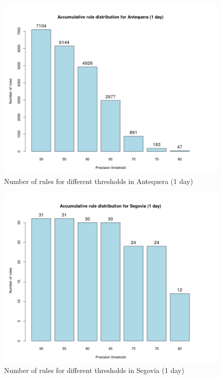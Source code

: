 \documentclass[a4paper,12pt]{article}
\begin{document}
\begin{figure}[hbtp]
\includegraphics[width=\textwidth]{img/precision_ant1.png}
\caption{Number of rules for different thresholds in Antequera (1 day)} \label{fig:precision_ant1}
\end{figure}

\begin{figure}[hbtp]
\includegraphics[width=\textwidth]{img/precision_seg1.png}
\caption{Number of rules for different thresholds in Segovia (1 day)} \label{fig:precision_seg1}
\end{figure}
\end{document}
